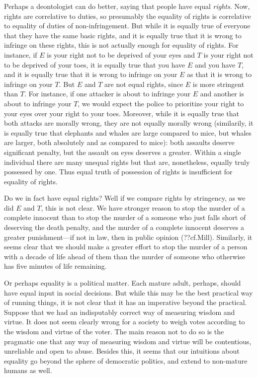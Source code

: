Perhaps a deontologist can do better, saying that people have equal \textit{rights}. Now, rights are correlative to 
duties, so presumably the
equality of rights is correlative to equality of duties of non-infringement. But while it is 
equally true of everyone that they have the same basic rights, and it is equally true that it is
wrong to infringe on these rights, this is not actually enough for equality of rights. For instance, 
if $E$ is your right not to be deprived of your eyes and $T$ is your right not to be deprived of your toes, 
it is equally true that you have $E$ and you have $T$, and it is equally true that it is wrong to 
infringe on your $E$ as that it is wrong to infringe on your $T$. But $E$ and $T$ are not equal rights, since
$E$ is more stringent than $T$. For instance, if one attacker is about to infringe your $E$ and another is about
to infringe your $T$, we would expect the police to prioritize your right to your eyes over your right to your
toes. Moreover, while it is equally true that both attacks are morally wrong, they are not equally morally wrong 
(similarily, it is equally true that elephants and whales are large compared to mice, but whales are larger, both
absolutely and as compared to mice): both assaults deserve significant penalty, but the assault on eyes deserves
a greater. Within a single individual there are many unequal rights but that are, nonetheless, equally truly possessed
by one. Thus equal truth of possession of rights is insufficient for equality of rights.

Do we in fact have equal rights? Well if we compare rights by stringency, as we did $E$ and $T$, this is not clear.
We have stronger reason to stop the murder of a complete innocent than to stop the murder of a someone who just falls
short of deserving the death penalty, and the murder of a complete innocent deserves a greater punishment---if not in law, then in public opinion (??cf.Mill). Similarly, it seems clear that we should make a greater effort to stop the murder of a person
with a decade of life ahead of them than the murder of someone who otherwise has five minutes of life remaining.

Or perhaps equality is a political matter. Each mature adult, perhaps, should have equal 
input in social decisions. But while this may be the best practical way of running things, it is not
clear that it has an imperative beyond the practical. Suppose that we had an indisputably correct way
of measuring wisdom and virtue. It does not seem clearly wrong for a society to weigh votes according to 
the wisdom and virtue of the voter. The main reason not to do so is the pragmatic one that any way of
measuring wisdom and virtue will be contentious, unreliable and open to abuse.  Besides this, it seems 
that our intuitions about equality go beyond the sphere of democratic politics, and extend to non-mature
humans as well.

